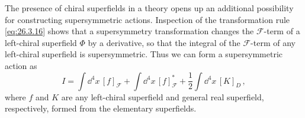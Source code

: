 The presence of chiral superfields in a theory opens up an additional
possibility for constructing supersymmetric actions. Inspection of the
transformation rule \eqref{eq:26.3.16} shows that a supersymmetry
transformation changes the $\mathcal{F}$-term of a left-chiral superfield
$\Phi$ by a derivative, so that the integral of the $\mathcal{F}$-term of any
left-chiral superfield is supersymmetric. Thus we can form a supersymmetric
action as
\begin{equation}
  I=\int \dd^4x\,[f]_{\mathcal{F}}
  +\int \dd^4x\,[f]_{\mathcal{F}}^*
  +\frac12\int \dd^4x\,[K]_D\,,
  \tag{26.3.30}\label{eq:26.3.30}
\end{equation}
where $f$ and $K$ are any left-chiral superfield and general real superfield,
respectively, formed from the elementary superfields.

